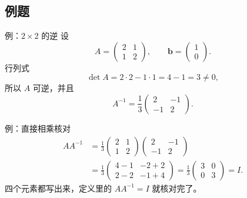 \documentclass[fontset=windows, chinese, 10pt, xcolor=dvipsnames]{beamer}
\begin{document}
\subsection{例题}

\begin{frame}{例：$2\times 2$ 的逆}
  设
  \begin{equation*}
    A=\begin{pmatrix}2&1\\1&2\end{pmatrix},
    \qquad
    \mathbf{b}=\begin{pmatrix}1\\0\end{pmatrix}.
  \end{equation*}
  行列式
  \begin{equation*}
    \det A=2\cdot 2-1\cdot 1=4-1=3\neq 0,
  \end{equation*}
  所以 $A$ 可逆，并且
  \begin{equation*}
    A^{-1}
    =\frac13
    \begin{pmatrix}2&-1\\-1&2\end{pmatrix}.
  \end{equation*}
\end{frame}

\begin{frame}{例：直接相乘核对}
  \begin{align*}
    AA^{-1}
    &= \frac13
    \begin{pmatrix}2&1\\1&2\end{pmatrix}
    \begin{pmatrix}2&-1\\-1&2\end{pmatrix} \\
    &= \frac13
    \begin{pmatrix}
      4-1 & -2+2 \\
      2-2 & -1+4
    \end{pmatrix}
    = \frac13
    \begin{pmatrix}3&0\\0&3\end{pmatrix}
    = I.
  \end{align*}
  四个元素都写出来，定义里的 $AA^{-1}=I$ 就核对完了。
\end{frame}
\end{document}
